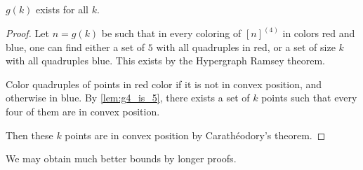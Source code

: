 \begin{theorem}
$g(k)$ exists for all $k$.
\end{theorem}
\begin{proof}	
Let $n=g(k)$ be such that in every coloring of $[n]^{(4)}$ in colors red and blue, one can find either a set of $5$ with all quadruples in red, or a set of size $k$ with all quadruples blue. This exists by the Hypergraph Ramsey theorem.

Color quadruples of points in red color if it is not in convex position, and otherwise in blue. By  \cref{lem:g4_is_5}, there exists a set of $k$ points such that every four of them are in convex position.

Then these $k$ points are in convex position by Carath\'eodory's theorem.
\end{proof}
\begin{remark}
We may obtain much better bounds by longer proofs.
\end{remark}

